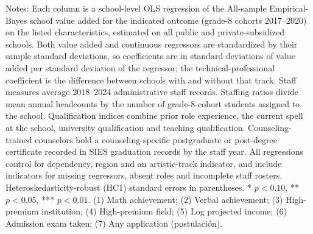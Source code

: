 \begin{table}[!htbp]
\begin{minipage}{\textwidth}
Notes: Each column is a school-level OLS regression of the All-sample Empirical-Bayes school value added for the indicated outcome (grade-8 cohorts 2017--2020) on the listed characteristics, estimated on all public and private-subsidized schools. Both value added and continuous regressors are standardized by their sample standard deviations, so coefficients are in standard deviations of value added per standard deviation of the regressor; the technical-professional coefficient is the difference between schools with and without that track. Staff measures average 2018--2024 administrative staff records. Staffing ratios divide mean annual headcounts by the number of grade-8-cohort students assigned to the school. Qualification indices combine prior role experience, the current spell at the school, university qualification and teaching qualification. Counseling-trained counselors hold a counseling-specific postgraduate or post-degree certificate recorded in SIES graduation records by the staff year. All regressions control for dependency, region and an artistic-track indicator, and include indicators for missing regressors, absent roles and incomplete staff rosters. Heteroskedasticity-robust (HC1) standard errors in parentheses. * $p<0.10$, ** $p<0.05$, *** $p<0.01$. (1) Math achievement; (2) Verbal achievement; (3) High-premium institution; (4) High-premium field; (5) Log projected income; (6) Admission exam taken; (7) Any application (postulaci\'on).
\end{minipage}
\end{table}
